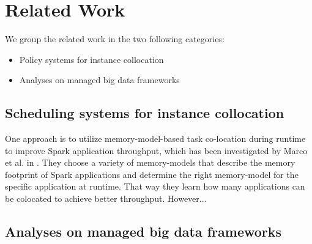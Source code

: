 \section{Related Work}

We group the related work in the two following categories:
\begin{itemize}
\item{Policy systems for instance collocation}
\item{Analyses on managed big data frameworks}
\end{itemize}

\subsection{Scheduling systems for instance collocation}
One approach is to utilize memory-model-based task
co-location during runtime to improve Spark application throughput, which has been
investigated by Marco et al. in \cite{Colocation}. They choose a variety of memory-models
that describe the memory footprint of Spark applications and determine the right memory-model
for the specific application at runtime. That way they learn how many applications can be colocated
to achieve better throughput. However... 

\subsection{Analyses on managed big data frameworks}

